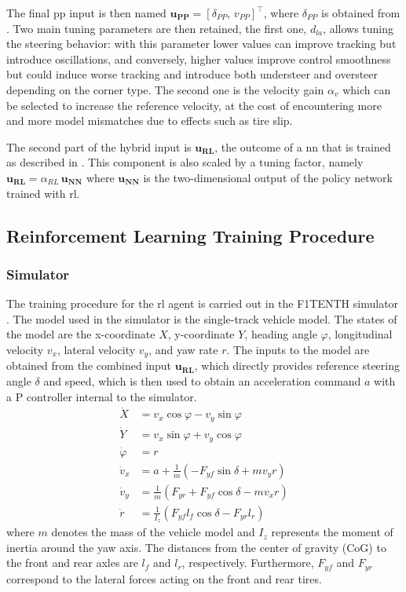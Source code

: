 \documentclass[letterpaper, conference]{IEEEtran}
\begin{document}
The final \gls{pp} input is then named $\mathbf{u_{PP}} = \left[\delta_{PP} ,\, v_{PP}\right]^\top$, where $\delta_{PP}$ is obtained from .
Two main tuning parameters are then retained, the first one, $d_{la}$, allows tuning the steering behavior: with this parameter lower values can improve tracking but introduce oscillations, and conversely, higher values improve control smoothness but could induce worse tracking and introduce both understeer and oversteer depending on the corner type.
The second one is the velocity gain $\alpha_v$ which can be selected to increase the reference velocity, at the cost of encountering more and more model mismatches due to effects such as tire slip.

The second part of the hybrid input is $\mathbf{u_{RL}}$, the outcome of a \gls{nn} that is trained as described in . This component is also scaled by a tuning factor, namely $\mathbf{u_{RL}} = \alpha_{RL}\,\mathbf{u_{NN}}$ where $\mathbf{u_{NN}}$ is the two-dimensional output of the policy network trained with \gls{rl}.

\subsection{Reinforcement Learning Training Procedure}
\label{ssec:rl_training}
\subsubsection{Simulator}
\label{ssec:sim}
The training procedure for the \gls{rl} agent is carried out in the F1TENTH simulator \cite{okelly2020f1tenthsim}. The model used in the simulator is the single-track vehicle model. The states of the model are the x-coordinate $X$, y-coordinate $Y$, heading angle $\varphi$, longitudinal velocity $v_x$, lateral velocity $v_y$, and yaw rate $r$. The inputs to the model are obtained from the combined input $\mathbf{u_{RL}}$, which directly provides reference steering angle $\delta$ and speed, which is then used to obtain an acceleration command $a$ with a P controller internal to the simulator.
\begin{align}
\dot X &=v_x \cos\varphi-v_y \sin \varphi \\
\dot Y &=v_x \sin\varphi+v_y \cos \varphi \\
\dot \varphi &=r \\
\dot v_x &=a+\frac{1}{m}(-F_{yf}\sin \delta+m v_y r) \\
\dot v_y &=\frac{1}{m}(F_{yr}+F_{yf}\cos \delta-m v_x r) \\
\dot r &=\frac{1}{I_z}(F_{yf}l_f\cos \delta-F_{yr}l_r) 
\end{align}
where \( m \) denotes the mass of the vehicle model and \( I_z \) represents the moment of inertia around the yaw axis. The distances from the center of gravity (CoG) to the front and rear axles are \( l_f \) and \( l_r \), respectively. Furthermore, \( F_{yf} \) and \( F_{yr} \) correspond to the lateral forces acting on the front and rear tires.
\end{document}
